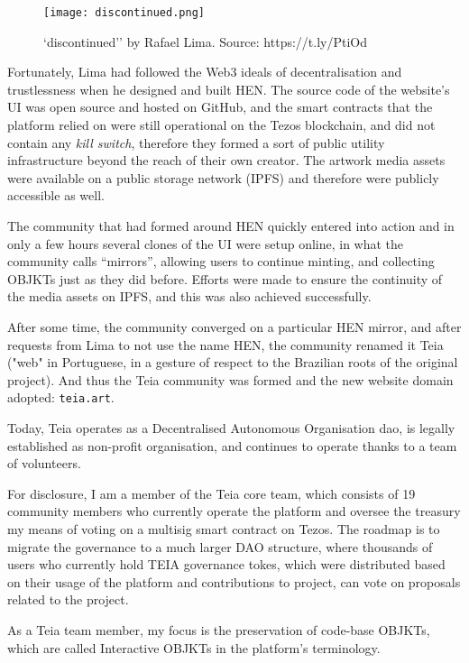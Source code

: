 \begin{figure}[h]
    \centering
    \texttt{[image: discontinued.png]}
    \caption[``discontinued'' by Rafael Lima]{`discontinued'' by Rafael Lima. Source: https://t.ly/PtiOd}
    \label{fig:discontinued}
\end{figure}

Fortunately, Lima had followed the Web3 ideals of decentralisation and trustlessness when he designed and built HEN. The source code of the website's UI was open source and hosted on GitHub, and the smart contracts that the platform relied on were still operational on the Tezos blockchain, and did not contain any \emph{kill switch}, therefore they formed a sort of public utility infrastructure beyond the reach of their own creator. The artwork media assets were available on a public storage network (IPFS) and therefore were publicly accessible as well.

The community that had formed around HEN quickly entered into action and in only a few hours several clones of the UI were setup online, in what the community calls ``mirrors'', allowing users to continue minting, and collecting OBJKTs just as they did before. Efforts were made to ensure the continuity of the media assets on IPFS, and this was also achieved successfully.

After some time, the community converged on a particular HEN mirror, and after requests from Lima to not use the name HEN, the community renamed it Teia ("web" in Portuguese, in a gesture of respect to the Brazilian roots of the original project). And thus the Teia community was formed and the new website domain adopted: \texttt{teia.art}.

Today, Teia operates as a Decentralised Autonomous Organisation \gls{dao}, is legally established as non-profit organisation, and continues to operate thanks to a team of volunteers.

For disclosure, I am a member of the Teia core team, which consists of 19 community members who currently operate the platform and oversee the treasury my means of voting on a multisig smart contract on Tezos. The roadmap is to migrate the governance to a much larger DAO structure, where thousands of users who currently hold TEIA governance tokes, which were distributed based on their usage of the platform and contributions to project, can vote on proposals related to the project.

As a Teia team member, my focus is the preservation of code-base OBJKTs, which are called Interactive OBJKTs in the platform's terminology.



